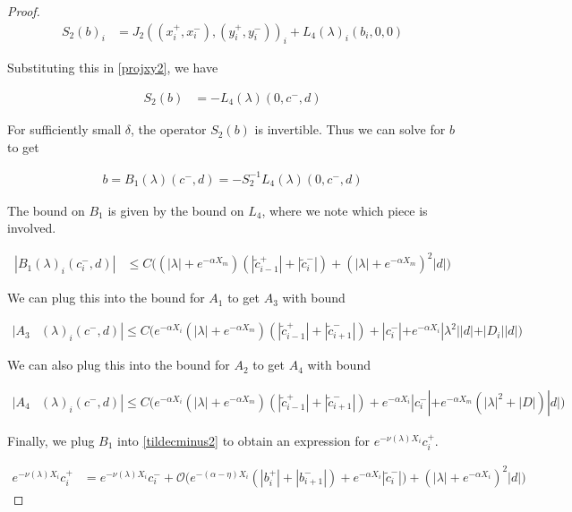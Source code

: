 \documentclass[thesis.tex]{subfiles}
\begin{document}
\begin{lemma}
\begin{proof}
\begin{align*}
S_2(b)_i &= J_2( (x_i^+, x_i^-),(y_i^+, y_i^-))_i 
+ L_4(\lambda)_i(b_i, 0, 0) 
\end{align*}

Substituting this in \eqref{projxy2}, we have

\begin{align*}
S_2(b) &= -L_4(\lambda)(0, c^-, d)
\end{align*}

For sufficiently small $\delta$, the operator $S_2(b)$ is invertible. Thus we can solve for $b$ to get

\begin{align}
b = B_1(\lambda)(c^-,d) 
= -S_2^{-1} L_4(\lambda)(0, c^-, d)
\end{align}

The bound on $B_1$ is given by the bound on $L_4$, where we note which piece is involved.

\begin{align*}
|B_1(\lambda)_i(c_i^-, d)| &\leq C \Big( (|\lambda| + e^{-\alpha X_m})(|\tilde{c}_{i-1}^+| + |\tilde{c}_i^-|)+ (|\lambda| + e^{-\alpha X_m})^2 |d| \Big)
\end{align*}

We can plug this into the bound for $A_1$ to get $A_3$ with bound

\begin{align*}
|A_3&(\lambda)_i(c^-, d)|
\leq C \Big(  
e^{-\alpha X_i} (|\lambda| + e^{-\alpha X_m})(|\tilde{c}_{i-1}^+| + |\tilde{c}_{i+1}^-|) +|c_i^-| + e^{-\alpha X_i} |\lambda^2||d| + |D_i||d| \Big)
\end{align*} 

We can also plug this into the bound for $A_2$ to get $A_4$ with bound

\begin{align*}
|A_4&(\lambda)_i(c^-, d)|
\leq C \Big( 
e^{-\alpha X_i} (|\lambda| + e^{-\alpha X_m})(|\tilde{c}_{i-1}^+| + |\tilde{c}_{i+1}^-|) + e^{-\alpha X_i} |c_i^-| + e^{-\alpha X_m}(|\lambda|^2 + |D|)|d| \Big)
\end{align*} 

Finally, we plug $B_1$ into \eqref{tildecminus2} to obtain an expression for $e^{-\nu(\lambda)X_i} c_i^+$.

\begin{align}\label{tildecminus2}
e^{-\nu(\lambda)X_i} c_i^+
&= e^{-\nu(\lambda)X_i} c_i^- + \mathcal{O}\Big( 
e^{-(\alpha - \eta) X_i} (|b_i^+| + |b_{i+1}^-|) + e^{-\alpha X_i} |\tilde{c}_i^-|) 
+ ( |\lambda| + e^{-\alpha X_i} )^2 |d| \Big)
\end{align}



\end{proof}
\end{lemma}
\end{document}
